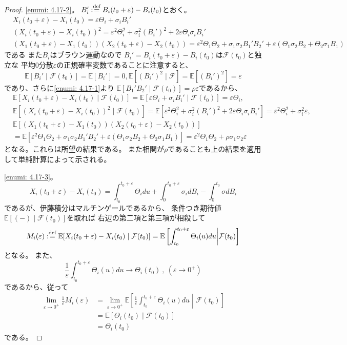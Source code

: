 \documentclass[uplatex]{jsarticle}
\theoremstyle{definition}
\def\ep{\varepsilon}
\def\E{\mathbb{E}}
\def\mcF{\mathcal{F}}
\def\dfn{:\overset{\mbox{{\scriptsize def}}}{=}}
\begin{document}
\begin{proof}
  \ref{enumi: 4.17-2}。
  \(B_i'\dfn B_i(t_0+\ep)-B_i(t_0)\)とおく。
  \begin{align*}
    &X_i(t_0 + \ep) - X_i(t_0) = \ep\Theta_i + \sigma_iB_i' \\
    &(X_i(t_0 + \ep) - X_i(t_0))^2
    = \ep^2\Theta_i^2 + \sigma_i^2(B_i')^2
    + 2\ep\Theta_i\sigma_i B_i' \\
    &(X_1(t_0 + \ep) - X_1(t_0))(X_2(t_0 + \ep) - X_2(t_0))
    = \ep^2\Theta_1\Theta_2 + \sigma_1\sigma_2B_1'B_2'
    + \ep(\Theta_1\sigma_2 B_2 + \Theta_2\sigma_1B_1)
  \end{align*}
  である
  また\(B_i\)はブラウン運動なので
  \(B_i' = B_i(t_0+\ep)-B_i(t_0)\)は\(\mcF(t_0)\)と独立な
  平均\(0\)分散\(\ep\)の正規確率変数であることに注意すると、
  \[
  \E[B_i'\mid \mcF(t_0)] = \E[B_i'] = 0,
  \E[(B_i')^2\mid\mcF] = \E[(B_i')^2] = \ep
  \]
  であり、さらに\ref{enumi: 4.17-1}より
  \(\E[B_1'B_2'\mid \mcF(t_0)] = \rho\ep\)であるから、
  \begin{align*}
    &\E[X_i(t_0 + \ep) - X_i(t_0)\mid \mcF(t_0)]
    = \E[\ep\Theta_i + \sigma_iB_i'\mid \mcF(t_0)]
    = \ep\Theta_i, \\
    &\E[(X_i(t_0 + \ep) - X_i(t_0))^2\mid \mcF(t_0)]
    = \E[\ep^2\Theta_i^2 + \sigma_i^2(B_i')^2
    + 2\ep\Theta_i\sigma_i B_i']
    = \ep^2\Theta_i^2 + \sigma_i^2\ep, \\
    &\E[(X_1(t_0 + \ep) - X_1(t_0))(X_2(t_0 + \ep) - X_2(t_0))] \\
    &= \E[\ep^2\Theta_1\Theta_2 + \sigma_1\sigma_2B_1'B_2'
    + \ep(\Theta_1\sigma_2 B_2 + \Theta_2\sigma_1B_1)]
    = \ep^2\Theta_1\Theta_2 + \rho\sigma_1\sigma_2\ep
  \end{align*}
  となる。これらは所望の結果である。
  また相関が\(\rho\)であることも上の結果を適用して単純計算によって示される。

  \ref{enumi: 4.17-3}。
  \[
  X_i(t_0+\ep) - X_i(t_0)
  = \int_{t_0}^{t_0 + \ep}\Theta_i du
  + \int_0^{t_0+\ep}\sigma_i dB_i - \int_0^{t_0}\sigma dB_i
  \]
  であるが、伊藤積分はマルチンゲールであるから、
  条件つき期待値\(\E [(-)\mid \mcF(t_0)]\)を取れば
  右辺の第二項と第三項が相殺して
  \[
  M_i(\ep) \dfn \E [X_i(t_0+\ep) - X_i(t_0) \mid \mcF(t_0)]
  = \E\left[ \int_{t_0}^{t_0 + \ep}\Theta_i(u) du
  \middle| \mcF(t_0)\right]
  \]
  となる。
  また、
  \[
  \frac{1}{\ep}\int_{t_0}^{t_0 + \ep}\Theta_i(u) du
  \to \Theta_i(t_0) \ , \ (\ep \to 0^+)
  \]
  であるから、従って
  \begin{align*}
    \lim _{\ep\to 0^+}\frac{1}{\ep}M_i(\ep)
    &= \lim _{\ep\to 0^+}
    \E\left[ \frac{1}{\ep}\int_{t_0}^{t_0 + \ep}\Theta_i(u) du
    \middle| \mcF(t_0)\right] \\
    &= \E\left[ \Theta_i(t_0)\middle| \mcF(t_0)\right] \\
    &= \Theta_i(t_0)
  \end{align*}
  である。


\end{proof}
\end{document}
